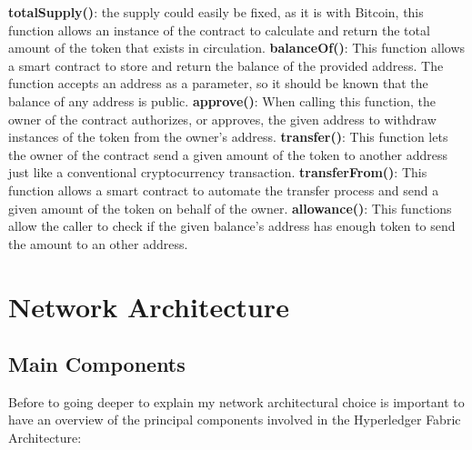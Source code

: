 \begin{outline}
    \1 \textbf{totalSupply()}: the supply could easily be fixed, as it is with Bitcoin, this function 
    allows an instance of the contract to calculate and return the total amount of the token that exists 
    in circulation.
    \1 \textbf{balanceOf()}: This function allows a smart contract to store and return the balance of 
    the provided address. The function accepts an address as a parameter, so it should be known that 
    the balance of any address is public.
    \1 \textbf{approve()}: When calling this function, the owner of the contract authorizes, or approves, 
    the given address to withdraw instances of the token from the owner’s address.
    \1 \textbf{transfer()}: This function lets the owner of the contract send a given amount of the token 
    to another address just like a conventional cryptocurrency transaction.
    \1 \textbf{transferFrom()}: This function allows a smart contract to automate the transfer process 
    and send a given amount of the token on behalf of the owner.
    \1 \textbf{allowance()}: This functions allow the caller to check if the given balance's address has 
    enough token to send the amount to an other address.
\end{outline}

\newpage
\section{Network Architecture}

\subsection{Main Components}

Before to going deeper to explain my network architectural choice is important to have an overview
of the principal components involved in the Hyperledger Fabric Architecture:

